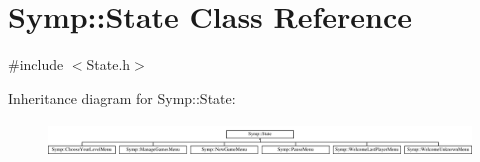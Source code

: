 \hypertarget{class_symp_1_1_state}{\section{Symp\-:\-:State Class Reference}
\label{class_symp_1_1_state}
}


{\ttfamily \#include $<$State.\-h$>$}

Inheritance diagram for Symp\-:\-:State\-:\begin{figure}[H]
\begin{center}
\leavevmode
\includegraphics[height=0.933333cm]{class_symp_1_1_state}
\end{center}
\end{figure}
